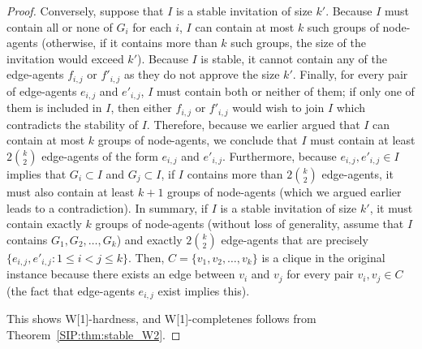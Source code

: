 \begin{proof}
	 Conversely, suppose that $I$ is a stable invitation of size $k'$. Because $I$ must contain all or none of $G_i$ for each $i$, $I$ can contain at most $k$ such groups of node-agents (otherwise, if it contains more than $k$ such groups, the size of the invitation would exceed $k'$). Because $I$ is stable, it cannot contain any of the edge-agents $f_{i,j}$ or $f'_{i,j}$ as they do not approve the size $k'$. Finally, for every pair of edge-agents $e_{i,j}$ and $e'_{i,j}$, $I$ must contain both or neither of them; if only one of them is included in $I$, then either $f_{i,j}$ or $f'_{i,j}$ would wish to join $I$ which contradicts the stability of $I$. Therefore, because we earlier argued that $I$ can contain at most $k$ groups of node-agents, we conclude that $I$ must contain at least $2\binom{k}{2}$ edge-agents of the form $e_{i,j}$ and $e'_{i,j}$. Furthermore, because $e_{i,j},e'_{i,j} \in I$ implies that $G_i\subset I$ and $G_j\subset I$, if $I$ contains more than $2\binom{k}{2}$ edge-agents, it must also contain at least $k+1$ groups of node-agents (which we argued earlier leads to a contradiction). In summary, if $I$ is a stable invitation of size $k'$, it must contain exactly $k$ groups of node-agents (without loss of generality, assume that $I$ contains $G_1, G_2, \dots, G_k$) and exactly $2\binom{k}{2}$ edge-agents that are precisely $\{e_{i,j}, e'_{i,j}: 1\leq i<j\leq k\}$. Then, $C = \{v_1, v_2, \dots, v_k\}$ is a clique in the original instance because there exists an edge between $v_i$ and $v_j$ for every pair $v_i,v_j\in C$ (the fact that edge-agents $e_{i,j}$ exist implies this). 
	
	This shows W[1]-hardness, and W[1]-completenes follows from Theorem~\ref{SIP:thm:stable_W2}. 

\end{proof}


